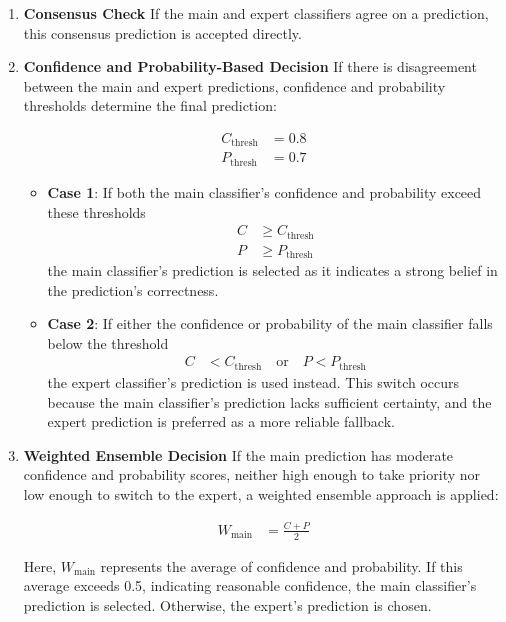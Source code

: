 \documentclass[9pt,a4paper,twoside]{rho-class/rho}
\begin{document}
    \begin{enumerate}
        \item \textbf{Consensus Check}
        If the main and expert classifiers agree on a prediction, this consensus prediction is accepted directly.
        
        \item \textbf{Confidence and Probability-Based Decision}
        If there is disagreement between the main and expert predictions, confidence and probability thresholds determine the final prediction:
        
        \begin{align*}
            C_{\text{thresh}} &= 0.8 \\
            P_{\text{thresh}} &= 0.7
        \end{align*}
        
        \begin{itemize}
            \item \textbf{Case 1}: If both the main classifier’s confidence and probability exceed these thresholds 
            \begin{align*}
                C &\geq C_{\text{thresh}} \\
                P &\geq P_{\text{thresh}}
            \end{align*}
            the main classifier’s prediction is selected as it indicates a strong belief in the prediction's correctness.

            \item \textbf{Case 2}: If either the confidence or probability of the main classifier falls below the threshold 
            \begin{align*}
                C &< C_{\text{thresh}} \quad \text{or} \quad P < P_{\text{thresh}}
            \end{align*}
            the expert classifier’s prediction is used instead. This switch occurs because the main classifier’s prediction lacks sufficient certainty, and the expert prediction is preferred as a more reliable fallback.
        \end{itemize}

        \item \textbf{Weighted Ensemble Decision}
        If the main prediction has moderate confidence and probability scores, neither high enough to take priority nor low enough to switch to the expert, a weighted ensemble approach is applied:
        
        \begin{align*}
            W_{\text{main}} &= \frac{C + P}{2}
        \end{align*}
        
        Here, $W_{\text{main}}$ represents the average of confidence and probability. If this average exceeds 0.5, indicating reasonable confidence, the main classifier’s prediction is selected. Otherwise, the expert’s prediction is chosen.

    \end{enumerate}
\end{document}
